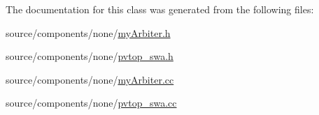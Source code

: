 The documentation for this class was generated from the following files:\begin{CompactItemize}
\item 
source/components/none/\hyperlink{myArbiter_8h}{myArbiter.h}\item 
source/components/none/\hyperlink{pvtop__swa_8h}{pvtop\_\-swa.h}\item 
source/components/none/\hyperlink{myArbiter_8cc}{myArbiter.cc}\item 
source/components/none/\hyperlink{pvtop__swa_8cc}{pvtop\_\-swa.cc}\end{CompactItemize}

